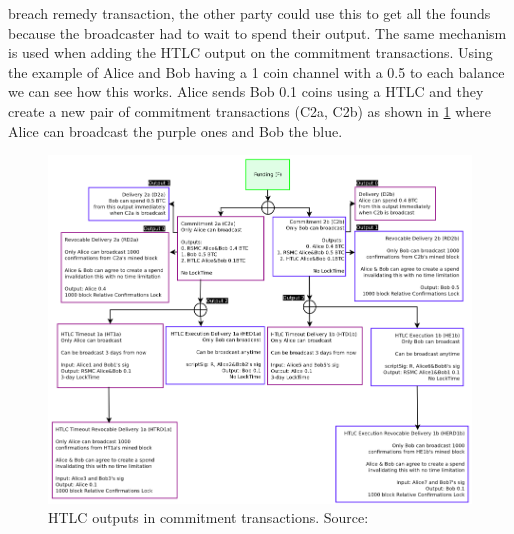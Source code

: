 breach remedy transaction, the other party could use this to get all the founds because the broadcaster had to wait to spend their output.
The same mechanism is used when adding the HTLC output on the commitment transactions. Using the example of Alice and Bob having a 1 coin channel with a 0.5 to each balance we can see how this works. Alice sends Bob 0.1 coins using a HTLC and they create a new pair of commitment transactions (C2a, C2b) as shown in \cref{fig:htlc_commit} where Alice can broadcast the purple ones and Bob the blue.


\begin{figure}[h]
    \centering
    \includegraphics[width=14cm]{figures/ln_htlc.png}
    \caption{HTLC outputs in commitment transactions.  Source: \cite{poon2015bitcoin}}
    \label{fig:htlc_commit}
\end{figure}



